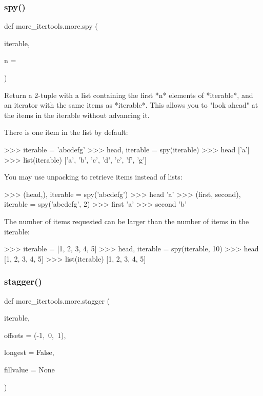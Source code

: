 \subsubsection{\texorpdfstring{spy()}{spy()}}
{\footnotesize\ttfamily def more\+\_\+itertools.\+more.\+spy (\begin{DoxyParamCaption}\item[{}]{iterable,  }\item[{}]{n = {} }\end{DoxyParamCaption})}

\begin{DoxyVerb}Return a 2-tuple with a list containing the first *n* elements of
*iterable*, and an iterator with the same items as *iterable*.
This allows you to "look ahead" at the items in the iterable without
advancing it.

There is one item in the list by default:

    >>> iterable = 'abcdefg'
    >>> head, iterable = spy(iterable)
    >>> head
    ['a']
    >>> list(iterable)
    ['a', 'b', 'c', 'd', 'e', 'f', 'g']

You may use unpacking to retrieve items instead of lists:

    >>> (head,), iterable = spy('abcdefg')
    >>> head
    'a'
    >>> (first, second), iterable = spy('abcdefg', 2)
    >>> first
    'a'
    >>> second
    'b'

The number of items requested can be larger than the number of items in
the iterable:

    >>> iterable = [1, 2, 3, 4, 5]
    >>> head, iterable = spy(iterable, 10)
    >>> head
    [1, 2, 3, 4, 5]
    >>> list(iterable)
    [1, 2, 3, 4, 5]\end{DoxyVerb}
 \mbox{\label{namespacemore__itertools_1_1more_a1b14bae5bc7cfc92c1f8b6f530e09119}} 
\subsubsection{\texorpdfstring{stagger()}{stagger()}}
{\footnotesize\ttfamily def more\+\_\+itertools.\+more.\+stagger (\begin{DoxyParamCaption}\item[{}]{iterable,  }\item[{}]{offsets = {\ttfamily (-\/1,~0,~1)},  }\item[{}]{longest = {\ttfamily False},  }\item[{}]{fillvalue = {\ttfamily None} }\end{DoxyParamCaption})}

